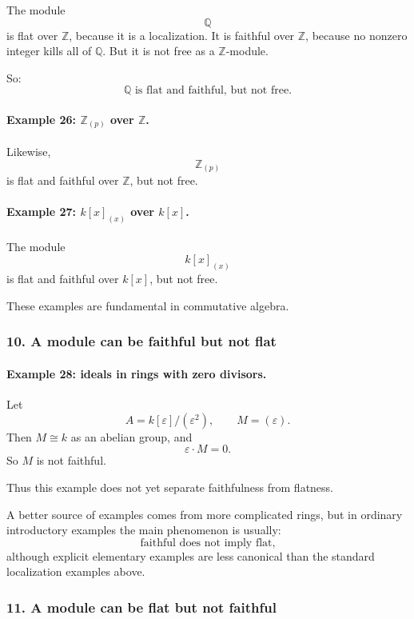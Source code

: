 \documentclass[12pt,a4paper]{article}
\theoremstyle{notespace}
\theoremstyle{definition}
\begin{document}
The module
\[
\mathbb Q
\]
is flat over \(\mathbb Z\), because it is a localization. It is faithful over \(\mathbb Z\), because no nonzero integer kills all of \(\mathbb Q\). But it is not free as a \(\mathbb Z\)-module.

So:
\[
\mathbb Q \text{ is flat and faithful, but not free.}
\]

\paragraph{Example 26: \(\mathbb Z_{(p)}\) over \(\mathbb Z\).}

Likewise,
\[
\mathbb Z_{(p)}
\]
is flat and faithful over \(\mathbb Z\), but not free.

\paragraph{Example 27: \(k[x]_{(x)}\) over \(k[x]\).}

The module
\[
k[x]_{(x)}
\]
is flat and faithful over \(k[x]\), but not free.

These examples are fundamental in commutative algebra.

\subsubsection{10. A module can be faithful but not flat}

\paragraph{Example 28: ideals in rings with zero divisors.}

Let
\[
A=k[\varepsilon]/(\varepsilon^2),
\qquad
M=(\varepsilon).
\]
Then \(M\cong k\) as an abelian group, and
\[
\varepsilon\cdot M=0.
\]
So \(M\) is not faithful.

Thus this example does not yet separate faithfulness from flatness.

A better source of examples comes from more complicated rings, but in ordinary introductory examples the main phenomenon is usually:
\[
\text{faithful does not imply flat,}
\]
although explicit elementary examples are less canonical than the standard localization examples above.

\subsubsection{11. A module can be flat but not faithful}
\end{document}

